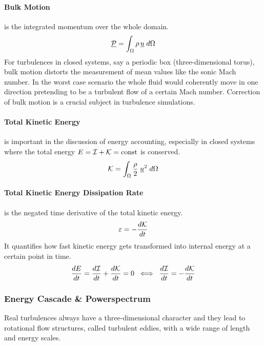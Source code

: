 \paragraph{Bulk Motion}
is the integrated momentum over the whole domain.
\begin{equation}
\label{eqn:bulk-motion}
    \underline{\mathcal{P}} = \int_{\Omega} \rho\,\underline{u} \; d\Omega
\end{equation}
For turbulences in closed systems, say a periodic box
(three-dimensional torus), bulk motion distorts the measurement of
mean values like the sonic Mach number. In the worst case scenario the whole
fluid would coherently move in one direction pretending to be a turbulent flow
of a certain Mach number. Correction of bulk motion is a crucial subject
in turbulence simulations.

\paragraph{Total Kinetic Energy}
is important in the discussion of energy accounting, especially in closed
systems where the total energy $E = \mathcal{I} + \mathcal{K} = \text{const}$ is
conserved.
\begin{equation}
\label{eqn:ekin}
    \mathcal{K} = \int_\Omega \frac{\rho}{2} \; \underline{u}^2 \; d\Omega
\end{equation}

\paragraph{Total Kinetic Energy Dissipation Rate}
is the negated time derivative of the total kinetic energy.
\begin{equation}
\label{eqn:ekindisp}
    \varepsilon = -\frac{d\mathcal{K}}{dt} 
\end{equation}
It quantifies how fast kinetic energy gets transformed into internal
energy at a certain point in time. 
\begin{equation}
\label{eqn:ekindisp-zero}
    \frac{dE}{dt} = \frac{d\mathcal{I}}{dt} + \frac{d\mathcal{K}}{dt} = 0 \;\;
        \Longleftrightarrow \;\; \frac{d\mathcal{I}}{dt} = -\frac{d\mathcal{K}}{dt}
\end{equation}

\subsubsection{Energy Cascade \& Powerspectrum}
\label{sec:theory-powerspectra}
Real turbulences always have a three-dimensional character and they lead to
rotational flow structures, called turbulent eddies, with a wide range of
length and energy scales.

